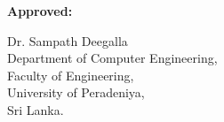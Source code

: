 \documentclass[conference]{IEEEtran}
\begin{document}




\vspace{3cm}

\noindent\textbf{Approved:} \dotfill

\vspace{0.4cm}

\noindent Dr. Sampath Deegalla \\
Department of Computer Engineering,\\
Faculty of Engineering,\\
University of Peradeniya,\\
Sri Lanka.
\end{document}

